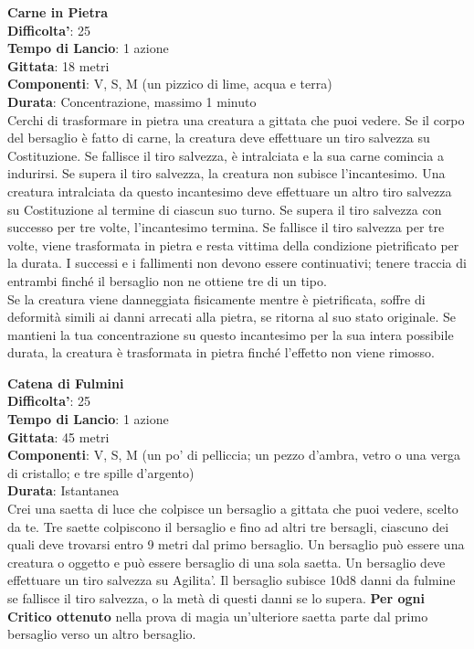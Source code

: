 \begin{multicols}{2}
\medskip\textbf{Carne in Pietra}\\
\textbf{Difficolta'}: 25\\
\textbf{Tempo di Lancio}: 1 azione\\
\textbf{Gittata}: 18 metri\\
\textbf{Componenti}: V, S, M (un pizzico di lime, acqua e terra)\\
\textbf{Durata}: Concentrazione, massimo 1 minuto\\
Cerchi di trasformare in pietra una creatura a gittata che puoi vedere. Se il corpo del bersaglio è fatto di carne, la creatura deve effettuare un tiro salvezza su Costituzione. Se fallisce il tiro salvezza, è intralciata e la sua carne comincia a indurirsi. Se supera il tiro salvezza, la creatura non subisce l’incantesimo. Una creatura intralciata da questo incantesimo deve effettuare un altro tiro salvezza su Costituzione al termine di ciascun suo turno. Se supera il tiro salvezza con successo per tre volte, l’incantesimo termina. Se fallisce il tiro salvezza per tre volte, viene trasformata in pietra e resta vittima della condizione pietrificato per la durata. I successi e i fallimenti non devono essere continuativi; tenere traccia di entrambi finché il bersaglio non ne ottiene tre di un tipo.\\
Se la creatura viene danneggiata fisicamente mentre è pietrificata, soffre di deformità simili ai danni arrecati alla pietra, se ritorna al suo stato originale. Se mantieni la tua concentrazione su questo incantesimo per la sua intera possibile durata, la creatura è trasformata in pietra finché l’effetto non viene rimosso.


\medskip\textbf{Catena di Fulmini}\\
\textbf{Difficolta'}: 25\\
\textbf{Tempo di Lancio}: 1 azione\\
\textbf{Gittata}: 45 metri\\
\textbf{Componenti}: V, S, M (un po’ di pelliccia; un pezzo d’ambra, vetro o una verga di cristallo; e tre spille d’argento)\\
\textbf{Durata}: Istantanea\\
Crei una saetta di luce che colpisce un bersaglio a gittata che puoi vedere, scelto da te. Tre saette colpiscono il bersaglio e fino ad altri tre bersagli, ciascuno dei quali deve trovarsi entro 9 metri dal primo bersaglio. Un bersaglio può essere una creatura o oggetto e può essere bersaglio di una sola saetta. Un bersaglio deve effettuare un tiro salvezza su Agilita'. Il bersaglio subisce 10d8 danni da fulmine se fallisce il tiro salvezza, o la metà di questi danni se lo supera.
\textbf{Per ogni Critico ottenuto} nella prova di magia un'ulteriore saetta parte dal primo bersaglio verso un altro bersaglio.


\end{multicols}
